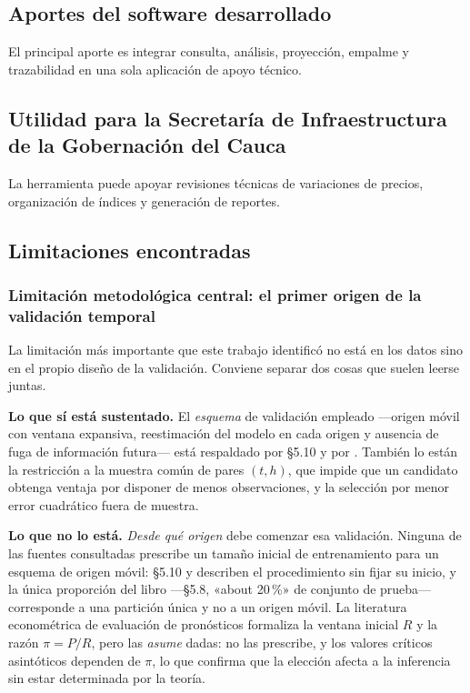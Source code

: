 \documentclass[12pt,letterpaper]{article}
\providecommand{\textcite}{\citet}
\begin{document}
\subsection{Aportes del software desarrollado}

El principal aporte es integrar consulta, análisis, proyección, empalme y trazabilidad en una sola aplicación de apoyo técnico.

\subsection{Utilidad para la Secretaría de Infraestructura de la Gobernación del Cauca}

La herramienta puede apoyar revisiones técnicas de variaciones de precios, organización de índices y generación de reportes.

\subsection{Limitaciones encontradas}
\label{sec:limitaciones_encontradas}

\subsubsection*{Limitación metodológica central: el primer origen de la validación temporal}

La limitación más importante que este trabajo identificó no está en los datos
sino en el propio diseño de la validación. Conviene separar dos cosas que suelen
leerse juntas.

\textbf{Lo que sí está sustentado.} El \emph{esquema} de validación empleado
---origen móvil con ventana expansiva, reestimación del modelo en cada origen y
ausencia de fuga de información futura--- está respaldado por
\textcite{hyndman2021fpp3} §5.10 y por \textcite{tashman2000}. También lo están la
restricción a la muestra común de pares \((t,h)\), que impide que un candidato
obtenga ventaja por disponer de menos observaciones, y la selección por menor
error cuadrático fuera de muestra.

\textbf{Lo que no lo está.} \emph{Desde qué origen} debe comenzar esa
validación. Ninguna de las fuentes consultadas prescribe un tamaño inicial de
entrenamiento para un esquema de origen móvil: \textcite{hyndman2021fpp3} §5.10 y
\textcite{tashman2000} describen el procedimiento sin fijar su inicio, y la única
proporción del libro ---§5.8, «about 20\,\%» de conjunto de prueba--- corresponde
a una partición única y no a un origen móvil. La literatura econométrica de
evaluación de pronósticos formaliza la ventana inicial \(R\) y la razón
\(\pi = P/R\), pero las \emph{asume} dadas: no las prescribe, y los valores
críticos asintóticos dependen de \(\pi\), lo que confirma que la elección afecta
a la inferencia sin estar determinada por la teoría.
\end{document}
